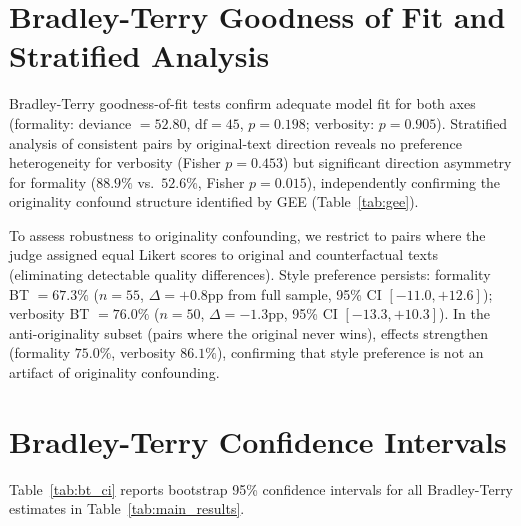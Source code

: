\section{Bradley-Terry Goodness of Fit and Stratified Analysis}
\label{app:bt_gof}

Bradley-Terry goodness-of-fit tests confirm adequate model fit for both axes (formality: deviance $= 52.80$, $\text{df} = 45$, $p = 0.198$; verbosity: $p = 0.905$).
Stratified analysis of consistent pairs by original-text direction reveals no preference heterogeneity for verbosity (Fisher $p = 0.453$) but significant direction asymmetry for formality ($88.9\%$ vs.\ $52.6\%$, Fisher $p = 0.015$), independently confirming the originality confound structure identified by GEE (Table~\ref{tab:gee}).

To assess robustness to originality confounding, we restrict to pairs where the judge assigned equal Likert scores to original and counterfactual texts (eliminating detectable quality differences).
Style preference persists: formality BT $= 67.3\%$ ($n = 55$, $\Delta = {+}0.8$pp from full sample, 95\% CI $[{-}11.0, {+}12.6]$); verbosity BT $= 76.0\%$ ($n = 50$, $\Delta = {-}1.3$pp, 95\% CI $[{-}13.3, {+}10.3]$).
In the anti-originality subset (pairs where the original never wins), effects strengthen (formality $75.0\%$, verbosity $86.1\%$), confirming that style preference is not an artifact of originality confounding.

\section{Bradley-Terry Confidence Intervals}
\label{app:bt_ci}

Table~\ref{tab:bt_ci} reports bootstrap 95\% confidence intervals for all Bradley-Terry estimates in Table~\ref{tab:main_results}.

